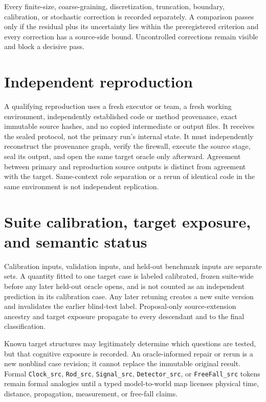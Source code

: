 \documentclass[11pt]{article}
\begin{document}
Every finite-size, coarse-graining, discretization, truncation, boundary,
calibration, or stochastic correction is recorded separately.  A comparison
passes only if the residual plus its uncertainty lies within the preregistered
criterion and every correction has a source-side bound.  Uncontrolled
corrections remain visible and block a decisive pass.

\section{Independent reproduction}

A qualifying reproduction uses a fresh executor or team, a fresh working
environment, independently established code or method provenance, exact
immutable source hashes, and no copied intermediate or output files.  It
receives the sealed protocol, not the primary run's internal state.  It must
independently reconstruct the provenance graph, verify the firewall, execute
the source stage, seal its output, and open the same target oracle only
afterward.  Agreement between primary and reproduction source outputs is
distinct from agreement with the target.  Same-context role separation or a
rerun of identical code in the same environment is not independent
replication.

\section{Suite calibration, target exposure, and semantic status}

Calibration inputs, validation inputs, and held-out benchmark inputs are
separate sets.  A quantity fitted to one target case is labeled calibrated,
frozen suite-wide before any later held-out oracle opens, and is not counted
as an independent prediction in its calibration case.  Any later retuning
creates a new suite version and invalidates the earlier blind-test label.
Proposal-only source-extension ancestry and target exposure propagate to every
descendant and to the final classification.

Known target structures may legitimately determine which questions are
tested, but that cognitive exposure is recorded.  An oracle-informed repair or
rerun is a new nonblind case revision; it cannot replace the immutable
original result.  Formal \texttt{Clock\_src}, \texttt{Rod\_src},
\texttt{Signal\_src}, \texttt{Detector\_src}, or \texttt{FreeFall\_src}
tokens remain formal analogies until a typed model-to-world map licenses
physical time, distance, propagation, measurement, or free-fall claims.
\end{document}
